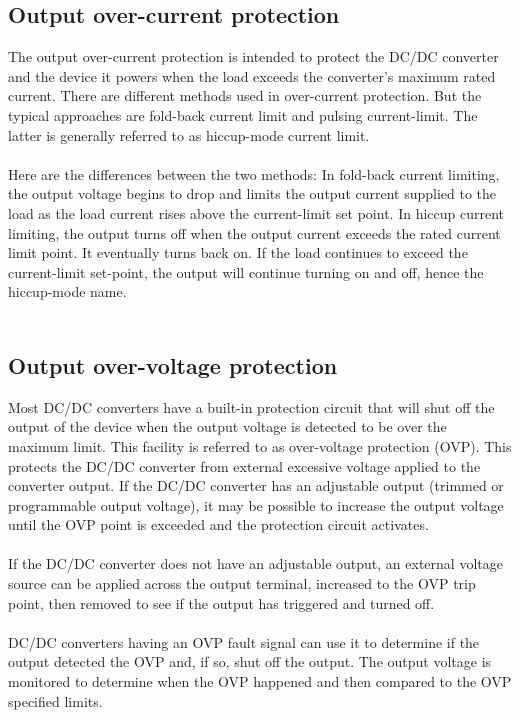 \subsection{Output over-current protection}

The output over-current protection is intended to protect the DC/DC converter and the device it powers when the load exceeds the converter’s maximum rated current. There are different methods used in over-current protection. But the typical approaches are fold-back current limit and pulsing current-limit. The latter is generally referred to as hiccup-mode current limit.
\\ \\
Here are the differences between the two methods: In fold-back current limiting, the output voltage begins to drop and limits the output current supplied to the load as the load current rises above the current-limit set point. In hiccup current limiting, the output turns off when the output current exceeds the rated current limit point. It eventually turns back on. If the load continues to exceed the current-limit set-point, the output will continue turning on and off, hence the hiccup-mode name.
\\ \\
\subsection{Output over-voltage protection} 

Most DC/DC converters have a built-in protection circuit that will shut off the output of the device when the output voltage is detected to be over the maximum limit. This facility is referred to as over-voltage protection (OVP). This protects the DC/DC converter from external excessive voltage applied to the converter output. If the DC/DC converter has an adjustable output (trimmed or programmable output voltage), it may be possible to increase the output voltage until the OVP point is exceeded and the protection circuit activates.
\\ \\
If the DC/DC converter does not have an adjustable output, an external voltage source can be applied across the output terminal, increased to the OVP trip point, then removed to see if the output has triggered and turned off.
\\ \\
DC/DC converters having an OVP fault signal can use it to determine if the output detected the OVP and, if so, shut off the output. The output voltage is monitored to determine when the OVP happened and then compared to the OVP specified limits.
\\ \\

